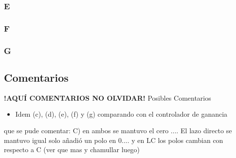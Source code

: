 \FloatBarrier
\subsubsection{E}%

\FloatBarrier
\subsubsection{F}%

\FloatBarrier
\subsubsection{G}%

\FloatBarrier
\subsection{Comentarios}


\textbf{!AQUÍ COMENTARIOS NO OLVIDAR!}
Posibles Comentarios
\begin{itemize}
    \item Idem (c), (d), (e), (f) y (g) comparando con el controlador de ganancia
\end{itemize}


que se pude comentar:
 C) en ambos se mantuvo el cero .... El lazo directo se mantuvo igual solo añadió un polo en 0.... y en LC los polos cambian con respecto a C  (ver que mas y chamullar luego)
